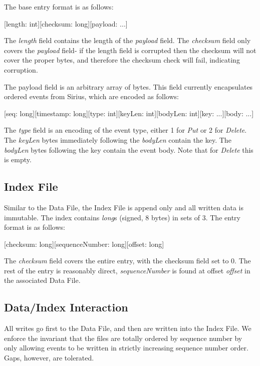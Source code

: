 \documentclass[11pt]{article}
\begin{document}
The base entry format is as follows:

\begin{center}
    [length: int][checksum: long][payload: ...]
\end{center}

The {\em length} field contains the length of the {\em payload} field. The
{\em checksum} field only covers the {\em payload} field- if the length
field is corrupted then the checksum will not cover the proper bytes, and therefore
the checksum check will fail, indicating corruption.

The payload field is an arbitrary array of bytes. This field currently encapsulates
ordered events from Sirius, which are encoded as follows:

\begin{center}
    [seq: long][timestamp: long][type: int][keyLen: int][bodyLen: int][key: ...][body: ...]
\end{center}

The {\em type} field is an encoding of the event type, either 1 for {\em Put} or 2 for
{\em Delete}.  The {\em keyLen} bytes immediately following the {\em bodyLen} contain the key.
The {\em bodyLen} bytes following the key contain the event body. Note that for {\em Delete}
this is empty.

\subsection{Index File}
Similar to the Data File, the Index File is append only and all written data is
immutable. The index contains {\em long}s (signed, 8 bytes) in sets of 3. The entry
format is as follows:

\begin{center}
    [checksum: long][sequenceNumber: long][offset: long]
\end{center}

The {\em checksum} field covers the entire entry, with the checksum field set to 0.
The rest of the entry is reasonably direct, {\em sequenceNumber} is found at offset
{\em offset} in the associated Data File.

\subsection{Data/Index Interaction}
All writes go first to the Data File, and then are written into the Index File.
We enforce the invariant that the files are totally ordered by sequence number
by only allowing events to be written in strictly increasing sequence number order.
Gaps, however, are tolerated.
\end{document}
